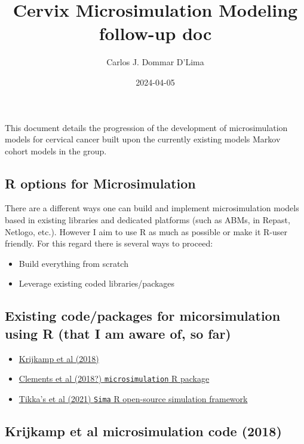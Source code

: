 \documentclass[
]{article}
\title{Cervix Microsimulation Modeling follow-up doc}
\author{Carlos J. Dommar D'Lima}
\date{2024-04-05}
\providecommand{\tightlist}{%
  \setlength{\itemsep}{0pt}\setlength{\parskip}{0pt}}
\begin{document}
\maketitle

This document details the progression of the development of
microsimulation models for cervical cancer built upon the currently
existing models Markov cohort models in the group.

\hypertarget{r-options-for-microsimulation}{%
\subsection{R options for
Microsimulation}\label{r-options-for-microsimulation}}

There are a different ways one can build and implement microsimulation
models based in existing libraries and dedicated platforms (such as
ABMs, in Repast, Netlogo, etc.). However I aim to use R as much as
possible or make it R-user friendly. For this regard there is several
ways to proceed:

\begin{itemize}
\tightlist
\item
  Build everything from scratch
\item
  Leverage existing coded libraries/packages
\end{itemize}

\hypertarget{existing-codepackages-for-micorsimulation-using-r-that-i-am-aware-of-so-far}{%
\subsection{Existing code/packages for micorsimulation using R (that I
am aware of, so
far)}\label{existing-codepackages-for-micorsimulation-using-r-that-i-am-aware-of-so-far}}

\begin{itemize}
\tightlist
\item
  \href{https://journals.sagepub.com/doi/abs/10.1177/0272989X18754513}{Krijkamp
  et al (2018)}
\item
  \href{https://cran.r-project.org/web/packages/microsimulation/index.html}{Clements
  et al (2018?) \texttt{microsimulation} R package}
\item
  \href{https://microsimulation.pub/articles/00240}{Tikka's et al (2021)
  \texttt{Sima} R open-source simulation framework}
\end{itemize}

\hypertarget{krijkamp-et-al-microsimulation-code-2018}{%
\subsection{Krijkamp et al microsimulation code
(2018)}\label{krijkamp-et-al-microsimulation-code-2018}}
\end{document}
